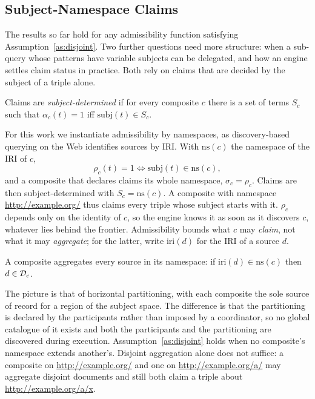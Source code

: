 \subsection{Subject-Namespace Claims}
\label{sec:namespace-claims}

The results so far hold for any admissibility function satisfying
Assumption~\ref{as:disjoint}. Two further questions need more structure: when a
sub-query whose patterns have variable subjects can be delegated, and how an engine
settles claim status in practice. Both rely on claims that are decided by the subject of
a triple alone.

\begin{definition}
\label{def:subject-determined}
Claims are \emph{subject-determined} if for every composite $c$ there is a set of terms
$S_c$ such that $\alpha_c(t) = 1$ iff $\mathrm{subj}(t) \in S_c$.
\end{definition}

For this work we instantiate admissibility by namespaces, as discovery-based querying on
the Web identifies sources by IRI. With $\mathrm{ns}(c)$ the namespace of the IRI of $c$,
\[
  \rho_c(t) = 1 \iff \mathrm{subj}(t) \in \mathrm{ns}(c),
\]
and a composite that declares claims its whole namespace, $\sigma_c = \rho_c$. Claims are
then subject-determined with $S_c = \mathrm{ns}(c)$. A composite with namespace
\url{http://example.org/} thus claims every triple whose subject starts with it.
$\rho_c$ depends only on the identity of $c$, so the engine knows it as soon as it
discovers $c$, whatever lies behind the frontier. Admissibility bounds what $c$ may
\emph{claim}, not what it may \emph{aggregate}; for the latter, write
$\mathrm{iri}(d)$ for the IRI of a source $d$.

\begin{assumption}
\label{as:ns-aggregation}
A composite aggregates every source in its namespace: if
$\mathrm{iri}(d) \in \mathrm{ns}(c)$ then $d \in \mathcal{D}_c$.~
\end{assumption}

The picture is that of horizontal partitioning, with each composite the sole source of
record for a region of the subject space. The difference is that the partitioning is
declared by the participants rather than imposed by a coordinator, so no global catalogue
of it exists and both the participants and the partitioning are discovered during
execution. Assumption~\ref{as:disjoint} holds when no composite's namespace extends
another's. Disjoint aggregation alone does not suffice: a composite on
\url{http://example.org/} and one on \url{http://example.org/a/} may aggregate disjoint
documents and still both claim a triple about \url{http://example.org/a/x}.


